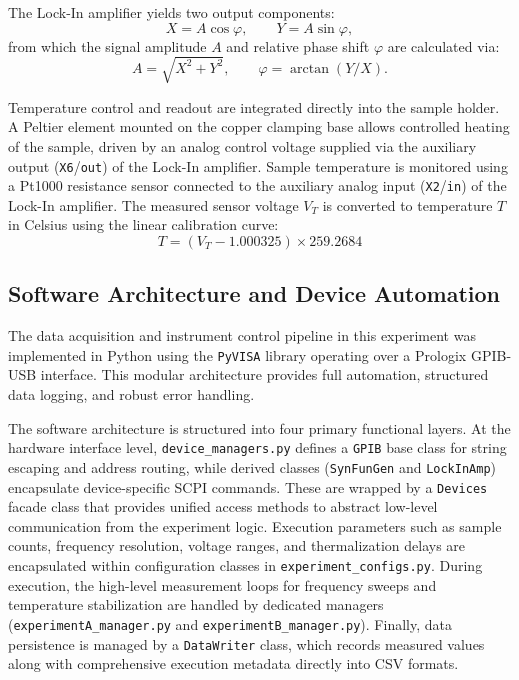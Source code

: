 The Lock-In amplifier yields two output components:
\begin{equation}
    X = A \cos φ, \qquad
    Y = A \sin φ, \label{eq:lockin}
\end{equation}
from which the signal amplitude \( A \) and relative phase shift \( φ \) are calculated via:
\begin{equation}
    A = \sqrt{X^2 + Y^2},  \qquad
    φ = \arctan(Y / X).
    \label{eq:calc_amp_and_phase}
\end{equation}

Temperature control and readout are integrated directly into the sample holder.
A Peltier element mounted on the copper clamping base allows controlled heating of the sample, driven by an analog control voltage supplied via the auxiliary output (\texttt{X6}/\texttt{out}) of the Lock-In amplifier.
Sample temperature is monitored using a Pt1000 resistance sensor connected to the auxiliary analog input (\texttt{X2}/\texttt{in}) of the Lock-In amplifier.
The measured sensor voltage \( V_T \) is converted to temperature \( T \) in Celsius using the linear calibration curve:
\begin{equation}
    T = (V_T - 1.000325) \times 259.2684
    \label{eq:temp_conversion}
\end{equation}

\subsection{Software Architecture and Device Automation}
The data acquisition and instrument control pipeline in this experiment was implemented in Python using the \texttt{PyVISA} library operating over a Prologix GPIB-USB interface.
This modular architecture provides full automation, structured data logging, and robust error handling.

The software architecture is structured into four primary functional layers.
At the hardware interface level, \texttt{device\_managers.py} defines a \texttt{GPIB} base class for string escaping and address routing, while derived classes (\texttt{SynFunGen} and \texttt{LockInAmp}) encapsulate device-specific SCPI commands.
These are wrapped by a \texttt{Devices} facade class that provides unified access methods to abstract low-level communication from the experiment logic.
Execution parameters such as sample counts, frequency resolution, voltage ranges, and thermalization delays are encapsulated within configuration classes in \texttt{experiment\_configs.py}.
During execution, the high-level measurement loops for frequency sweeps and temperature stabilization are handled by dedicated managers (\texttt{experimentA\_manager.py} and \texttt{experimentB\_manager.py}).
Finally, data persistence is managed by a \texttt{DataWriter} class, which records measured values along with comprehensive execution metadata directly into CSV formats.

